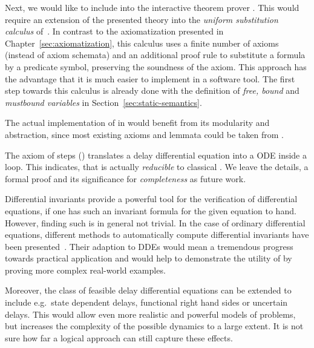         Next, we would like to include \ddL into the interactive theorem prover \KeYmaeraX.
        This would require an extension of the presented theory into the \emph{uniform substitution calculus} of~\cite{Platzer15Uniform}.
        In contrast to the axiomatization presented in Chapter~\ref{sec:axiomatization}, this calculus uses a finite number of axioms (instead of axiom schemata) and an additional proof rule to substitute a formula by a predicate symbol, preserving the soundness of the axiom. This approach has the advantage that it is much easier to implement in a software tool.
        The first step towards this calculus is already done with the definition of \emph{free, bound} and \emph{mustbound variables} in Section~\ref{sec:static-semantics}.

        The actual implementation of \ddL in \KeYmaeraX would benefit from its modularity and abstraction, since most existing axioms and lemmata could be taken from \dL.

        The axiom of steps () translates a delay differential equation into a ODE inside a loop. This indicates, that \ddL is actually \emph{reducible} to classical \dL. We leave the details, a formal proof and its significance for \emph{completeness} as future work.

        Differential invariants provide a powerful tool for the verification of differential equations, if one has such an invariant formula for the given equation to hand.
        However, finding such is in general not trivial. In the case of ordinary differential equations, different methods to automatically compute differential invariants have been presented~\cite{Platzer12LogicsDynSys}.
        Their adaption to DDEs would mean a tremendous progress towards practical application and would help to demonstrate the utility of \ddL by proving more complex real-world examples.

        Moreover, the class of feasible delay differential equations can be extended to include e.g.\ state dependent delays, functional right hand sides or uncertain delays.
        This would allow even more realistic and powerful models of problems, but increases the complexity of the possible dynamics to a large extent.
        It is not sure how far a logical approach can still capture these effects.
